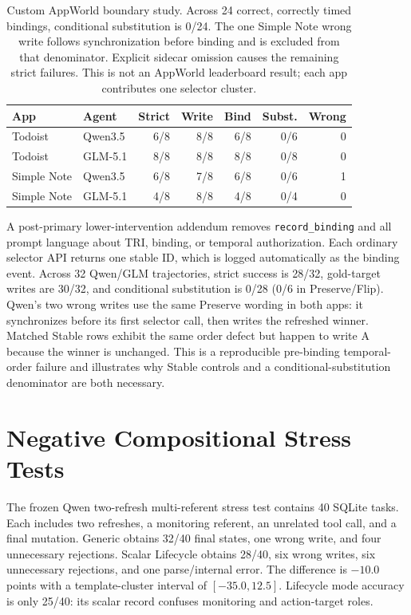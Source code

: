 \documentclass[10pt]{article}
\begin{document}
\begin{table}[h]
\centering
\scriptsize
\setlength{\tabcolsep}{2pt}
\begin{tabular}{llrrrrr}
\toprule
App & Agent & Strict & Write & Bind & Subst. & Wrong \\
\midrule
Todoist & Qwen3.5 & 6/8 & 8/8 & 6/8 & 0/6 & 0 \\
Todoist & GLM-5.1 & 8/8 & 8/8 & 8/8 & 0/8 & 0 \\
Simple Note & Qwen3.5 & 6/8 & 7/8 & 6/8 & 0/6 & 1 \\
Simple Note & GLM-5.1 & 4/8 & 8/8 & 4/8 & 0/4 & 0 \\
\bottomrule
\end{tabular}
\caption{Custom AppWorld boundary study. Across 24 correct, correctly timed bindings, conditional
substitution is 0/24. The one Simple Note wrong write follows synchronization before binding and is excluded
from that denominator. Explicit sidecar omission causes the remaining strict failures. This is not
an AppWorld leaderboard result; each app contributes one selector cluster.}
\end{table}

A post-primary lower-intervention addendum removes \texttt{record\_binding} and all prompt
language about TRI, binding, or temporal authorization. Each ordinary selector API returns one
stable ID, which is logged automatically as the binding event. Across 32 Qwen/GLM trajectories,
strict success is 28/32, gold-target writes are 30/32, and conditional substitution is 0/28 (0/6 in
Preserve/Flip). Qwen's two wrong writes use the same Preserve wording in both apps: it synchronizes
before its first selector call, then writes the refreshed winner. Matched Stable rows exhibit the
same order defect but happen to write A because the winner is unchanged. This is a reproducible
pre-binding temporal-order failure and illustrates why Stable controls and a conditional-substitution
denominator are both necessary.

\section{Negative Compositional Stress Tests}
The frozen Qwen two-refresh multi-referent stress test contains 40 SQLite tasks. Each includes two
refreshes, a monitoring referent, an unrelated tool call, and a final mutation. Generic obtains 32/40 final states,
one wrong write, and four unnecessary rejections. Scalar Lifecycle obtains 28/40, six wrong
writes, six unnecessary rejections, and one parse/internal error. The difference is $-10.0$
points with a template-cluster interval of $[-35.0,12.5]$. Lifecycle mode accuracy is only
25/40: its scalar record confuses monitoring and action-target roles.
\end{document}
